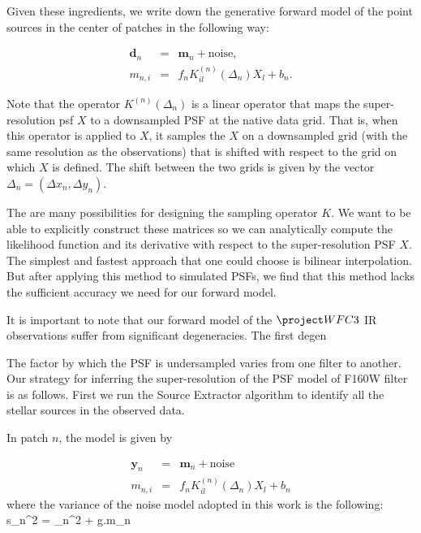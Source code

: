 Given these ingredients, we write down the generative forward model of the point sources in the center of patches in the following way:

\begin{eqnarray}
\mathbf{d}_{n} &=&  \mathbf{m}_{n} + \mathrm{noise}, \\
m_{n,i} &=& f_{n}K^{(n)}_{il} (\Delta_n) X_{l} + b_{n}. 
\end{eqnarray} 

Note that the operator $K^{(n)}(\Delta_n)$ is a linear operator that maps the super-resolution psf $X$ to a downsampled PSF at the native 
data grid. That is, when this operator is applied to $X$, it samples the $X$ on a downsampled grid (with the same resolution as the observations) 
that is shifted with respect to the grid on which $X$ is defined. The shift between the two grids is given by the vector $\Delta_n = (\Delta x_n , \Delta y_n)$.

The are many possibilities for designing the sampling operator $K$. We want to be able to explicitly construct these matrices so we can analytically 
compute the likelihood function and its derivative with respect to the super-resolution PSF $X$. The simplest and fastest approach that one could 
choose is bilinear interpolation. But after applying this method to simulated PSFs, we find that this method lacks the sufficient accuracy we 
need for our forward model.


It is important to note that our forward model of the $\wfc$ IR observations suffer from significant degeneracies. The first degen

The factor by which the PSF is undersampled varies from one filter to another. Our strategy for inferring the super-resolution of the PSF model of F160W filter is as follows. 
First we run the Source Extractor algorithm to identify all the stellar sources in the observed data. 

In patch $n$, the model is given by

\begin{eqnarray}
\mathbf{y}_{n} &=&  \mathbf{m}_{n} + \mathrm{noise} \\
m_{n,i} &=& f_{n}K^{(n)}_{il} (\Delta_n) X_{l} + b_{n} 
\end{eqnarray} 
where the variance of the noise model adopted in this work is the following:
\beq
s_n^2 = \sigma_{n}^{2} + g.m_{n}
\eeq    

